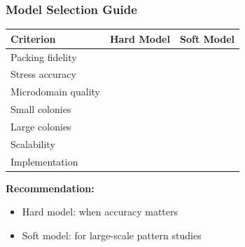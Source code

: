 \documentclass[
	10pt,
	t
]{beamer}
\newcommand{\xmark}{\ding{55}}%
\newcommand{\cmark}{\ding{51}}%
\begin{document}
\begin{frame}
    \frametitle{Model Selection Guide}

    \begin{table}
        \centering
        \small
        \begin{tabular}{lcc}
            \toprule
            \textbf{Criterion}  & \textbf{Hard Model} & \textbf{Soft Model} \\
            \midrule
            Packing fidelity    & \cmark              & \xmark              \\
            Stress accuracy     & \cmark              & \xmark              \\
            Microdomain quality & \cmark              & \xmark              \\
            Small colonies      & \cmark              & \xmark              \\
            Large colonies      & \xmark              & \cmark              \\
            Scalability         & \xmark              & \cmark              \\
            Implementation      & \xmark              & \cmark              \\
            \bottomrule
        \end{tabular}
    \end{table}

    \vspace{0.3cm}

    \textbf{Recommendation:}
    \begin{itemize}
        \item Hard model: when accuracy matters
        \item Soft model: for large-scale pattern studies
    \end{itemize}

\end{frame}
\end{document}
